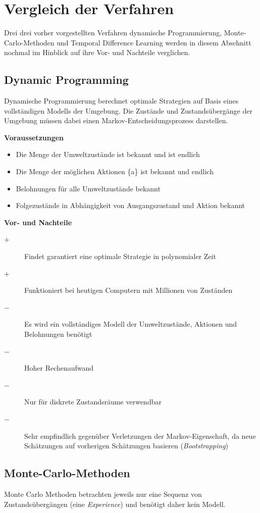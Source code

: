 \documentclass[10pt]{scrartcl}
\begin{document}
\section{Vergleich der Verfahren}
Drei drei vorher vorgestellten Verfahren dynamische Programmierung, Monte-Carlo-Methoden und Temporal Difference Learning werden in diesem Abschnitt nochmal im Hinblick auf ihre Vor- und Nachteile verglichen.

\subsection{Dynamic Programming}
Dynamische Programmierung berechnet optimale Strategien auf Basis eines vollständigen Modells der Umgebung. Die Zustände und Zustandsübergänge der Umgebung müssen dabei einen Markov-Entscheidungsprozess darstellen.

\vspace{1em}
\textbf{Voraussetzungen}
\begin{itemize}
\item{Die Menge der Umweltzustände ist bekannt und ist endlich}
\item{Die Menge der möglichen Aktionen \{a\} ist bekannt und endlich}
\item{Belohnungen für alle Umweltzustände bekannt}
\item{Folgezustände in Abhängigkeit von Ausgangszustand und Aktion bekannt}
\end{itemize}

\vspace{1em}
\textbf{Vor- und Nachteile}
\begin{description}
\item[$+$] Findet garantiert eine optimale Strategie in polynomialer Zeit
\item[$+$] Funktioniert bei heutigen Computern mit Millionen von Zuständen
\item[$-$] Es wird ein vollständiges Modell der Umweltzustände, Aktionen und Belohnungen benötigt
\item[$-$] Hoher Rechenaufwand
\item[$-$] Nur für diskrete Zustandsräume verwendbar
\item[$-$] Sehr empfindlich gegenüber Verletzungen der Markov-Eigenschaft, da neue Schätzungen auf vorherigen Schätzungen basieren (\emph{Bootstrapping})
\end{description}

\subsection{Monte-Carlo-Methoden}
Monte Carlo Methoden betrachten jeweils nur eine Sequenz von Zustandsübergängen (eine \emph{Experience}) und benötigt daher kein Modell. \\
\end{document}
